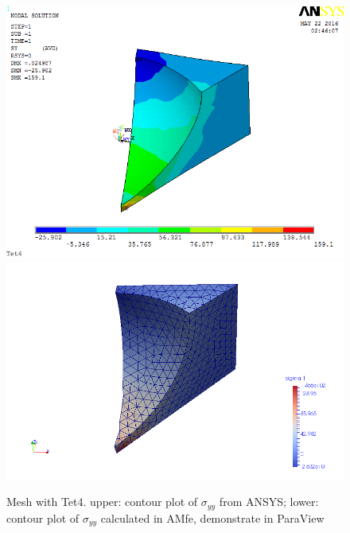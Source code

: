 \begin{figure}[htbp]
	\begin{center}
		\includegraphics[width=13cm,clip]{Tet4Syy.png} 		
		\includegraphics[width=13cm,clip]{Tet4SyyP.png} 		
		\caption{Mesh with Tet4. upper: contour plot of $\sigma_{yy}$ from ANSYS; lower: contour plot of $\sigma_{yy}$ calculated in AMfe, demonstrate in ParaView} \label{fig: Tet4Syy}
	\end{center}
\end{figure}
\clearpage 

